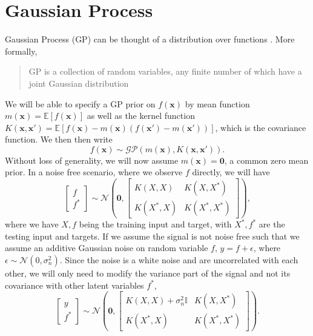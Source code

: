 \documentclass{statsmsc}
\begin{document}
\section{Gaussian Process}
Gaussian Process (GP) can be thought of a distribution over functions \citep{rasmussen_williams_2006}.
More formally, \begin{quote}GP is a collection of random variables, any finite number of which have a joint Gaussian distribution\end{quote}
We will be able to specify a GP prior on $f(\mathbf{x})$ by mean function $m(\mathbf{x})=\mathbb{E}[f(\mathbf{x})]$ as well as the kernel function $K(\mathbf{x}, \mathbf{x'})=\mathbb{E}[f(\mathbf{x})-m(\mathbf{x})(f(\mathbf{x'})-m(\mathbf{x'}))]$, which is the covariance function.
We then then write
$$
f(\mathbf{x})\sim\mathcal{GP}(m(\mathbf{x}),K(\mathbf{x},\mathbf{x'})).
$$
Without loss of generality, we will now assume $m(\mathbf{x})=\mathbf{0}$, a common zero mean prior.
In a noise free scenario, where we observe $f$ directly, we will have
$$
\begin{bmatrix}
  f\\f^*
\end{bmatrix}
\sim \mathcal{N}
\left(\mathbf{0}, \begin{bmatrix}K(X, X) & K(X, X^*) \\ K(X^*, X) & K(X^*, X^*) \end{bmatrix}\right),
$$
where we have $X, f$ being the training input and target, with $X^*, f^*$ are the testing input and targets.
If we assume the signal is not noise free such that we assume an additive Gaussian noise on random variable $f$, $y=f+\epsilon$, where $\epsilon\sim\mathcal{N}(0, \sigma_n^2)$.
Since the noise is a white noise and are uncorrelated with each other, we will only need to modify the variance part of the signal and not its covariance with other latent variables $f^*$,
\begin{equation}
\begin{bmatrix}
  y\\f^*
\end{bmatrix}
\sim \mathcal{N}
\left(\mathbf{0}, \begin{bmatrix}K(X, X)+\sigma^2_n\mathbb{I} & K(X, X^*) \\ K(X^*, X) & K(X^*, X^*) \end{bmatrix}\right).
\label{equ:joint_gp_noise}
\end{equation}
\end{document}
